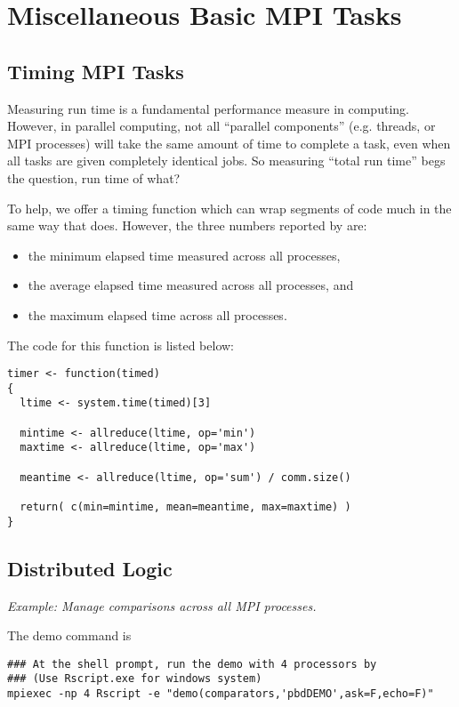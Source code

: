 \section{Miscellaneous Basic MPI Tasks}

\subsection{Timing MPI Tasks}

Measuring run time is a fundamental performance measure in computing.
However, in parallel computing, not all ``parallel components'' (e.g.
threads, or MPI processes) will take the same amount of time to complete
a task, even when all tasks are given completely identical jobs.
So measuring ``total run time'' begs the question, run time of what?

To help, we offer a timing function  which can wrap
segments of code much in the same way that  does.
However, the three numbers reported by  are:
\begin{itemize}
\item the minimum elapsed time measured across all processes,
\item the average elapsed time measured across all processes, and
\item the maximum elapsed time across all processes.
\end{itemize}
The code for this function is listed below:

\begin{lstlisting}[language=rr,title=Timer Function]
timer <- function(timed)
{
  ltime <- system.time(timed)[3]
  
  mintime <- allreduce(ltime, op='min')
  maxtime <- allreduce(ltime, op='max')
  
  meantime <- allreduce(ltime, op='sum') / comm.size()
  
  return( c(min=mintime, mean=meantime, max=maxtime) )
}
\end{lstlisting}




\subsection{Distributed Logic}%

\emph{Example:  Manage comparisons across all MPI processes.}

The demo command is
\begin{lstlisting}
### At the shell prompt, run the demo with 4 processors by
### (Use Rscript.exe for windows system)
mpiexec -np 4 Rscript -e "demo(comparators,'pbdDEMO',ask=F,echo=F)"
\end{lstlisting}

